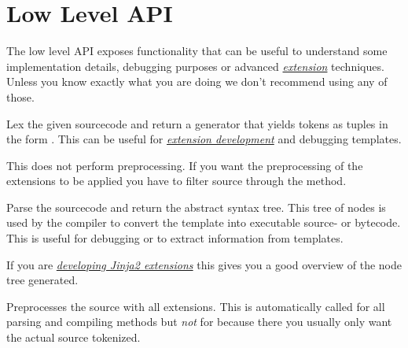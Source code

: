 \documentclass[a4paper,10pt,english]{sphinxmanual}
\begin{document}
\section{Low Level API}
\label{api:low-level-api}\label{api:id3}
The low level API exposes functionality that can be useful to understand some
implementation details, debugging purposes or advanced {\hyperref[extensions:jinja-extensions]{\emph{extension}}} techniques.  Unless you know exactly what you are doing we
don't recommend using any of those.

\begin{fulllineitems}
\label{api:jinja2.Environment.lex}
Lex the given sourcecode and return a generator that yields
tokens as tuples in the form .
This can be useful for {\hyperref[extensions:writing-extensions]{\emph{extension development}}}
and debugging templates.

This does not perform preprocessing.  If you want the preprocessing
of the extensions to be applied you have to filter source through
the {\hyperref[api:jinja2.Environment.preprocess]{}} method.

\end{fulllineitems}


\begin{fulllineitems}
\label{api:jinja2.Environment.parse}
Parse the sourcecode and return the abstract syntax tree.  This
tree of nodes is used by the compiler to convert the template into
executable source- or bytecode.  This is useful for debugging or to
extract information from templates.

If you are {\hyperref[extensions:writing-extensions]{\emph{developing Jinja2 extensions}}}
this gives you a good overview of the node tree generated.

\end{fulllineitems}


\begin{fulllineitems}
\label{api:jinja2.Environment.preprocess}
Preprocesses the source with all extensions.  This is automatically
called for all parsing and compiling methods but \emph{not} for {\hyperref[api:jinja2.Environment.lex]{}}
because there you usually only want the actual source tokenized.

\end{fulllineitems}
\end{document}
